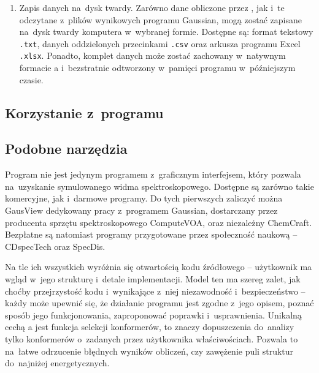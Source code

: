 \begin{enumerate}
  \item Zapis danych na~dysk twardy.
    Zarówno dane obliczone przez \tesliper{}, jak i~te odczytane z~plików wynikowych programu
      Gaussian, mogą zostać zapisane na~dysk twardy komputera w~wybranej formie.
    Dostępne są: format tekstowy \texttt{.txt}, danych oddzielonych przecinkami \texttt{.csv}
      oraz arkusza programu Excel \texttt{.xlsx}.
    Ponadto, komplet danych może zostać zachowany w~natywnym formacie \tesliper{}a
      i~bezstratnie odtworzony w~pamięci programu w~późniejszym czasie.
  
\end{enumerate}

\subsection{Korzystanie z~programu}\label{essence:use}

\subsection{Podobne narzędzia}\label{essence:simmilar}
Program \tesliper{} nie jest jedynym programem z~graficznym interfejsem, który pozwala
  na~uzyskanie symulowanego widma spektroskopowego.
Dostępne są zarówno takie komercyjne, jak i~darmowe programy.
Do tych pierwszych zaliczyć można GausView dedykowany pracy z~programem
  Gaussian, dostarczany przez producenta sprzętu spektroskopowego ComputeVOA,
  oraz niezależny ChemCraft.
Bezpłatne są natomiast programy przygotowane przez społeczność naukową \---
  CDspecTech oraz SpecDis.

Na tle ich wszystkich \tesliper{} wyróżnia się otwartością kodu źródłowego \---
  użytkownik ma wgląd w~jego strukturę i~detale implementacji.
Model ten ma szereg zalet, jak choćby przejrzystość kodu i~wynikające z~niej niezawodność
  i~bezpieczeństwo \--- każdy może upewnić się, że działanie programu jest zgodne z~jego opisem,
  poznać sposób jego funkcjonowania, zaproponować poprawki i~usprawnienia.
Unikalną cechą \tesliper{}a jest funkcja selekcji konformerów, to znaczy dopuszczenia do~analizy
  tylko konformerów o~zadanych przez użytkownika właściwościach.
Pozwala to na~łatwe odrzucenie błędnych wyników obliczeń, czy zawężenie puli struktur do~najniżej
  energetycznych.

